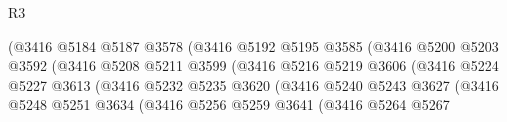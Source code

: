 \begin{lexlean}{R3}
\begin{coremodule}
                                            (@3416
                                              @5184
                                              @5187
                                              @3578
                                              (@3416
                                                @5192
                                                @5195
                                                @3585
                                                (@3416
                                                  @5200
                                                  @5203
                                                  @3592
                                                  (@3416
                                                    @5208
                                                    @5211
                                                    @3599
                                                    (@3416
                                                      @5216
                                                      @5219
                                                      @3606
                                                      (@3416
                                                        @5224
                                                        @5227
                                                        @3613
                                                        (@3416
                                                          @5232
                                                          @5235
                                                          @3620
                                                          (@3416
                                                            @5240
                                                            @5243
                                                            @3627
                                                            (@3416
                                                              @5248
                                                              @5251
                                                              @3634
                                                              (@3416
                                                                @5256
                                                                @5259
                                                                @3641
                                                                (@3416
                                                                  @5264
                                                                  @5267

\end{coremodule}
\end{lexlean}
